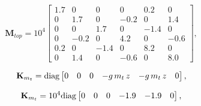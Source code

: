\documentclass{article}
\begin{document}
 \begin{small}
    \begin{equation}
       \mathbf{M}_{top}  = 10^{4}
        \begin{bmatrix}
1.7 & 0 & 0 & 0 & 0.2 & 0\\
0 & 1.7 & 0 & -0.2 & 0 & 1.4\\
0 & 0 & 1.7 & 0 & -1.4 & 0\\
0 & -0.2 & 0 & 4.2 & 0 & -0.6\\
0.2 & 0 & -1.4 & 0 & 8.2 & 0\\
0 & 1.4 & 0 & -0.6 & 0 & 8.0
        \end{bmatrix},
        \label{eq:fea:Mtop_num}
    \end{equation}
\end{small}


\begin{small}
    \begin{equation}
        \mathbf{K}_{m_t} = \textnormal{diag}
        \begin{bmatrix}
			0 & 0 & 0 & -g\,m_{t}\,z  & -g\,m_{t}\,z   & 0
        \end{bmatrix},
        \label{eq:fea:K_m_ecc}
    \end{equation}
\end{small}

\begin{small}
    \begin{equation}
        \mathbf{K}_{m_t} = 10^{4} \textnormal{diag}
        \begin{bmatrix}
			0 & 0 & 0 & -1.9  & -1.9   & 0
        \end{bmatrix},
        \label{eq:fea:K_m_ecc_num}
    \end{equation}
\end{small}
\end{document}
